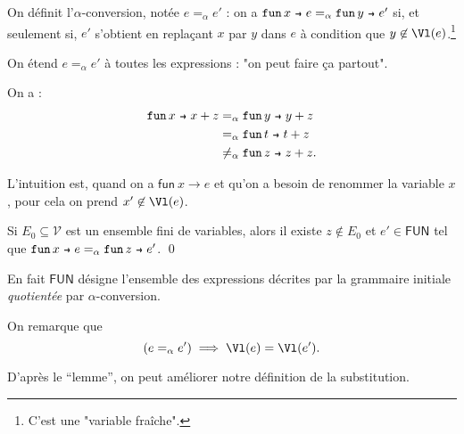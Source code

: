 \documentclass[../main]{subfiles}
\begin{document}
  \begin{defn}
    On définit l'$\alpha$-conversion, notée $e =_\alpha e'$ :
    on a $\fun x e =_\alpha \fun y e'$ si, et seulement si,
    $e'$ s'obtient en replaçant $x$ par $y$ dans $e$
    à condition que $y \not\in \Vl(e)$.\footnote{C'est une "variable fraîche".}

    On étend $e =_\alpha e'$ à toutes les expressions : "on peut faire ça partout".
  \end{defn}

  \begin{exm}
    On a :
    \begin{align*}
      \fun x x + z &=_\alpha \fun y y + z\\
      &=_\alpha \fun t t + z\\
      &\neq _\alpha \fun z z + z
    .\end{align*}
  \end{exm}
  
  L'intuition est, quand on a $\mathsf{fun}\ x \to e$ et qu'on a besoin de renommer la variable $x$, pour cela on prend $x' \not\in \Vl(e)$.

  \begin{not-lem}
    Si $E_0 \subseteq \mathcal{V}$ est un ensemble fini de variables, alors il existe $z \not\in E_0$ et $e' \in \mathsf{FUN}$ tel que $\fun x e =_\alpha \fun z e'$.
    \qed
  \end{not-lem}

  \begin{rmk}
    En fait $\mathsf{FUN}$ désigne l'ensemble des expressions décrites par la grammaire initiale \textit{quotientée} par $\alpha$-conversion.
  \end{rmk}

  \begin{rmk}
    On remarque que \[
      (e =_\alpha e') \implies \Vl(e) = \Vl(e')
    .\]
  \end{rmk}

  D'après le ``lemme'', on peut améliorer notre définition de la substitution.
\end{document}

